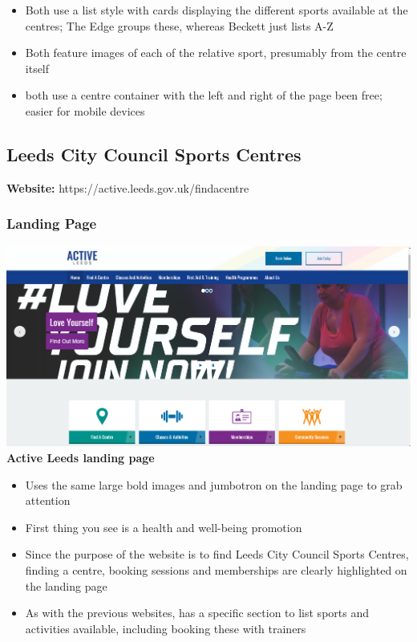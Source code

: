 \documentclass[12pt,a4paper]{article}
\begin{document}
\begin{itemize}
	\item Both use a list style with cards displaying the different sports available at the centres; The Edge groups these, whereas Beckett just lists A-Z
	
	\item Both feature images of each of the relative sport, presumably from the centre itself 
	
	\item both use a centre container with the left and right of the page been free; easier for mobile devices
\end{itemize}


\subsection{Leeds City Council Sports Centres}

\begin{center}
	\textbf{Website:} https://active.leeds.gov.uk/findacentre
\end{center}

\subsubsection{Landing Page}

\begin{center}
	\includegraphics[width=0.7\linewidth]{img/leeds-city-council-sports-centres.png}\\
	\textbf{Active Leeds landing page}
\end{center}

\begin{itemize}
	\item Uses the same large bold images and jumbotron on the landing page to grab attention
	
	\item First thing you see is a health and well-being promotion
	
	\item Since the purpose of the website is to find Leeds City Council Sports Centres, finding a centre, booking sessions and memberships are clearly highlighted on the landing page
	
	\item As with the previous websites, has a specific section to list sports and activities available, including booking these with trainers
\end{itemize}
\end{document}
